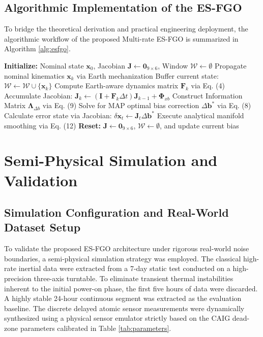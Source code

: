 \documentclass[journal]{IEEEtran}
\begin{document}
	\subsection{Algorithmic Implementation of the ES-FGO}
	To bridge the theoretical derivation and practical engineering deployment, the algorithmic workflow of the proposed Multi-rate ES-FGO is summarized in Algorithm \ref{alg:esfgo}.
	\begin{algorithm}[htbp]
		\caption{Multi-rate ES-FGO with Schur Complement}
		\label{alg:esfgo}
		\begin{algorithmic}[1]
			\STATE \textbf{Initialize:} Nominal state $\bm{x}_0$, Jacobian $\bm{J} \leftarrow \bm{0}_{9 \times 6}$, Window $\mathcal{W} \leftarrow \emptyset$
			\STATE Propagate nominal kinematics $\bm{x}_k$ via Earth mechanization
			\STATE Buffer current state: $\mathcal{W} \leftarrow \mathcal{W} \cup \{ \bm{x}_k \}$
			\STATE Compute Earth-aware dynamics matrix $\bm{F}_k$ via Eq. (4)
			\STATE Accumulate Jacobian: $\bm{J}_k \leftarrow (\bm{I} + \bm{F}_k \Delta t)\bm{J}_{k-1} + \bm{\Phi}_{xb}$
			\STATE Construct Information Matrix $\bm{\Lambda}_{\Delta b}$ via Eq. (9)
			\STATE Solve for MAP optimal bias correction $\Delta \bm{b}^*$ via Eq. (8)
			\STATE Calculate error state via Jacobian: $\delta \bm{x}_t \leftarrow \bm{J}_t \Delta \bm{b}^*$
			\STATE Execute analytical manifold smoothing via Eq. (12)
			\ENDFOR
			\STATE \textbf{Reset:} $\bm{J} \leftarrow \bm{0}_{9 \times 6}$, $\mathcal{W} \leftarrow \emptyset$, and update current bias
			\ENDIF
			\ENDFOR
		\end{algorithmic}
	\end{algorithm}
	
	\section{Semi-Physical Simulation and Validation}
	
	\subsection{Simulation Configuration and Real-World Dataset Setup}
	To validate the proposed ES-FGO architecture under rigorous real-world noise boundaries, a semi-physical simulation strategy was employed. The classical high-rate inertial data were extracted from a 7-day static test conducted on a high-precision three-axis turntable. To eliminate transient thermal instabilities inherent to the initial power-on phase, the first five hours of data were discarded. A highly stable 24-hour continuous segment was extracted as the evaluation baseline. The discrete delayed atomic sensor measurements were dynamically synthesized using a physical sensor emulator strictly based on the CAIG dead-zone parameters calibrated in Table \ref{tab:parameters}.
	
\end{document}
